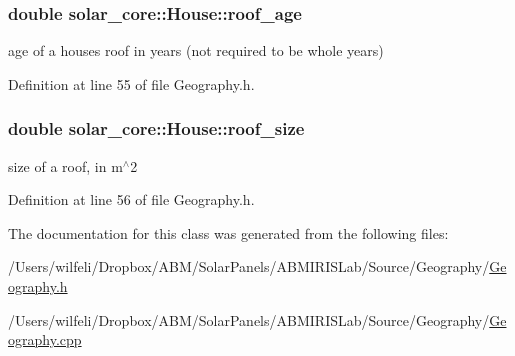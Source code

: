 \subsubsection[{roof\+\_\+age}]{\setlength{\rightskip}{0pt plus 5cm}double solar\+\_\+core\+::\+House\+::roof\+\_\+age}\label{classsolar__core_1_1_house_aa6491ce4f3fc6d99a59ea80cfb8194fc}
age of a house\textquotesingle{}s roof in years (not required to be whole years) 

Definition at line 55 of file Geography.\+h.

\hypertarget{classsolar__core_1_1_house_a7f872cb768b83e70e263590078fa4c7d}{}
\subsubsection[{roof\+\_\+size}]{\setlength{\rightskip}{0pt plus 5cm}double solar\+\_\+core\+::\+House\+::roof\+\_\+size}\label{classsolar__core_1_1_house_a7f872cb768b83e70e263590078fa4c7d}
size of a roof, in m$^\wedge$2 

Definition at line 56 of file Geography.\+h.



The documentation for this class was generated from the following files\+:\begin{DoxyCompactItemize}
\item 
/\+Users/wilfeli/\+Dropbox/\+A\+B\+M/\+Solar\+Panels/\+A\+B\+M\+I\+R\+I\+S\+Lab/\+Source/\+Geography/\hyperlink{_geography_8h}{Geography.\+h}\item 
/\+Users/wilfeli/\+Dropbox/\+A\+B\+M/\+Solar\+Panels/\+A\+B\+M\+I\+R\+I\+S\+Lab/\+Source/\+Geography/\hyperlink{_geography_8cpp}{Geography.\+cpp}\end{DoxyCompactItemize}
